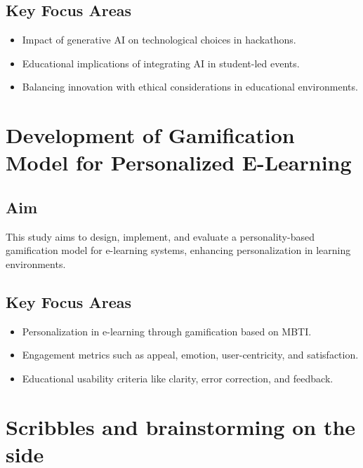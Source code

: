 \documentclass{article}
\begin{document}
\subsection{Key Focus Areas}
\begin{itemize}
    \item Impact of generative AI on technological choices in hackathons.
    \item Educational implications of integrating AI in student-led events.
    \item Balancing innovation with ethical considerations in educational environments.
\end{itemize}

\newpage
\section{Development of Gamification Model for Personalized E-Learning}

\subsection{Aim}
This study aims to design, implement, and evaluate a personality-based gamification model for e-learning systems, enhancing personalization in learning environments.

\subsection{Key Focus Areas}
\begin{itemize}
    \item Personalization in e-learning through gamification based on MBTI.
    \item Engagement metrics such as appeal, emotion, user-centricity, and satisfaction.
    \item Educational usability criteria like clarity, error correction, and feedback.
\end{itemize}

\newpage


\newpage
\section{Scribbles and brainstorming on the side}
\end{document}
